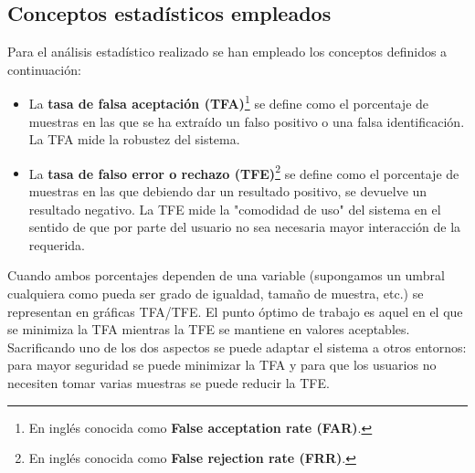 \subsection{Conceptos estadísticos empleados}
Para el análisis estadístico realizado se han empleado los conceptos definidos a continuación:
\begin{itemize}
	\item{La \textbf{tasa de falsa aceptación (TFA)}\footnote{En inglés conocida como \textbf{False acceptation rate (FAR)}.} se define como el porcentaje de muestras en las que se ha extraído un falso positivo o una falsa identificación. La TFA mide la robustez del sistema.}
	\item{La \textbf{tasa de falso error o rechazo (TFE)}\footnote{En inglés conocida como \textbf{False rejection rate (FRR)}.} se define como el porcentaje de muestras en las que debiendo dar un resultado positivo, se devuelve un resultado negativo. La TFE mide la "comodidad de uso" del sistema en el sentido de que por parte del usuario no sea necesaria mayor interacción de la requerida. }
\end {itemize}

Cuando ambos porcentajes dependen de una variable (supongamos un umbral cualquiera como pueda ser grado de igualdad, tamaño de muestra, etc.) se representan en gráficas TFA/TFE. El punto óptimo de trabajo es aquel en el que se minimiza la TFA mientras la TFE se mantiene en valores aceptables. Sacrificando uno de los dos aspectos se puede adaptar el sistema a otros entornos: para mayor seguridad se puede minimizar la TFA y para que los usuarios no necesiten tomar varias muestras se puede reducir la TFE.

